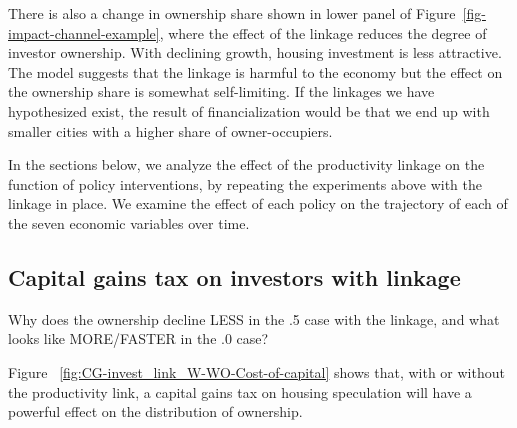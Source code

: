 There is also a change in ownership share shown in lower panel of Figure~\ref{fig-impact-channel-example}, where the effect of the linkage reduces the degree of investor ownership. With declining growth, housing investment is less attractive. The model suggests that the linkage is harmful to the economy but the effect on the ownership share is somewhat self-limiting.  If the linkages we have hypothesized exist, the result of financialization would be that we end up with smaller cities with a higher share of owner-occupiers. %

In the sections below, we analyze the effect of the productivity linkage on the function of policy interventions, by repeating the experiments above with the linkage in place.  %
We examine the effect of each policy 
on the trajectory of each of the seven economic variables over time. 
\newpage

\subsection{Capital gains tax on investors with linkage}\label{subsec:CGinvest}

{\color{red} Why does the ownership decline LESS in the .5 case with the linkage, and what looks like MORE/FASTER in the .0 case?

}

Figure ~\ref{fig:CG-invest_link_W-WO-Cost-of-capital} shows that, with or without the productivity link, a capital gains tax on housing speculation will have a powerful effect on the distribution of ownership. 

